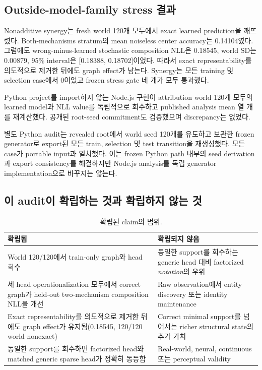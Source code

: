 \subsection{Outside-model-family stress 결과}

Nonadditive synergy는 fresh world 120개 모두에서 exact learned prediction을
깨뜨렸다. Both-mechanisms stratum의 mean noiseless center accuracy는 0.14104였다.
그럼에도 wrong-minus-learned stochastic composition NLL은 0.18545, world SD는
0.00879, 95\% interval은 [0.18388, 0.18702]이었다. 따라서 exact
representability를 의도적으로 제거한 뒤에도 graph effect가 남는다. Synergy는
모든 training 및 selection case에서 0이었고 frozen stress gate 네 개가 모두
통과했다.

Python project를 import하지 않는 Node.js 구현이 attribution world 120개 모두의
learned model과 NLL value를 독립적으로 회수하고 published analysis mean 열 개를
재계산했다. 공개된 root-seed commitment도 검증했으며 discrepancy는 없었다.

별도 Python audit는 revealed root에서 world seed 120개를 유도하고 보관한 frozen
generator로 export된 모든 train, selection 및 test transition을 재생성했다. 모든
case가 portable input과 일치했다. 이는 frozen Python path 내부의 seed derivation과
export consistency를 해결하지만 Node.js analysis를 독립 generator implementation으로
바꾸지는 않는다.

\subsection{이 audit이 확립하는 것과 확립하지 않는 것}

\begin{table}[H]
\centering
\small
\caption{확립된 claim의 범위.}
\label{tab:claim-scope}
\begin{tabular}{@{}p{}p{}@{}}
\toprule
확립됨 & 확립되지 않음 \\
\midrule
World 120/120에서 train-only graph와 head 회수 & 동일한 support를 회수하는 generic head 대비 factorized \emph{notation}의 우위 \\
세 head operationalization 모두에서 correct graph가 held-out two-mechanism composition NLL을 개선 & Raw observation에서 entity discovery 또는 identity maintenance \\
Exact representability를 의도적으로 제거한 뒤에도 graph effect가 유지됨(0.18545, 120/120 world nonexact) & Correct minimal support를 넘어서는 richer structural state의 추가 가치 \\
동일한 support를 회수하면 factorized head와 matched generic sparse head가 정확히 동등함 & Real-world, neural, continuous 또는 perceptual validity \\
\bottomrule
\end{tabular}
\end{table}
